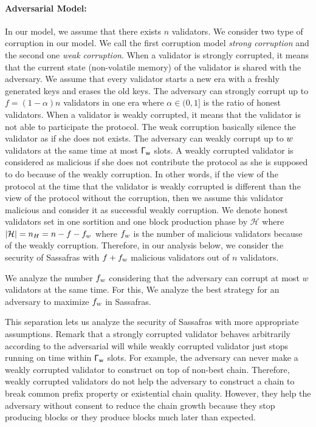 \paragraph{Adversarial Model:} In our model, we assume that there exists $ n $ validators.  We consider two type of corruption in our model. We call the first corruption model \emph{strong corruption} and the second one \emph{weak corruption}. When a validator is strongly corrupted, it means that the current state (non-volatile memory) of the validator is shared with the adversary. We assume that every validator starts a new era with a freshly generated keys and erases the old keys. The adversary can strongly corrupt up to $ f = (1-\alpha)n $ validators in one era where $ \alpha \in (0,1] $ is the ratio of honest validators.  
When a validator is weakly corrupted, it means that the validator is not able to participate the protocol. The weak corruption basically silence the validator as if she does not exists. The adversary can weakly corrupt up to $ w $ validators at the same time at most  $ \mathsf{\Gamma_{w}} $ slots. A weakly corrupted validator is considered as malicious if she does not contribute the protocol as she is supposed to do because of the weakly corruption.  In other words, if the view of the protocol at the time that the validator is weakly corrupted is different than the view of the protocol without the corruption, then we assume this validator malicious and consider it as successful weakly corruption.  We denote honest validators set in one sortition and one block production phase by $ \mathcal{H} $ where $ |\mathcal{H}| = n_H = n-f - f_{w}$ where $ f_{w} $ is the number of malicious validators because of the weakly corruption.  Therefore, in our analysis below, we consider the security of Sassafras with $ f + f_{w}$ malicious validators out of $ n $ validators. 

We analyze the number $ f_{w} $ considering that the adversary can corrupt at most $ w $ validators at the same time. For this, We analyze the best strategy for an adversary to maximize $ f_{w} $ in Sassafras.



This separation lets us analyze the security of Sassafras with more appropriate assumptions. Remark that a strongly corrupted validator behaves arbitrarily according to the adversarial will while weakly corrupted validator just stops running on time within $ \mathsf{\Gamma_{w}} $ slots. For example, the adversary can never make a weakly corrupted validator to construct on top of non-best chain. Therefore, weakly corrupted validators do not help  the adversary to construct a chain to break common prefix property or existential chain quality.  However, they help the adversary without consent to reduce the chain growth because they stop producing blocks or they produce blocks much later than expected.









